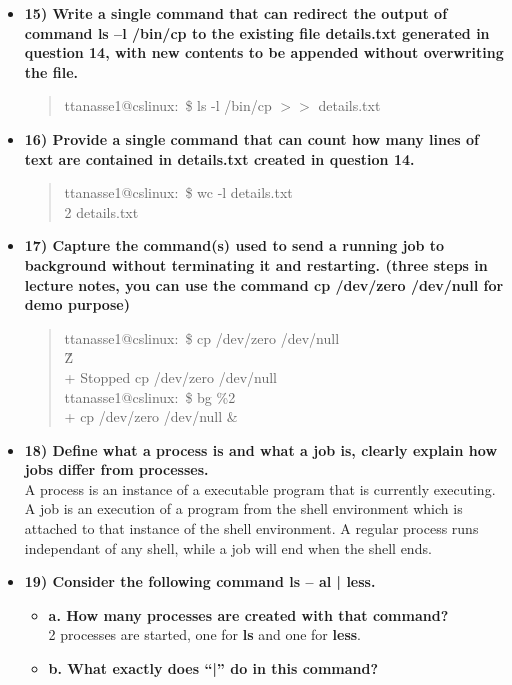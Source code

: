 \documentclass{article}
\begin{document}
\begin{itemize}
\begin{quote}
  \end{quote}
  \item \textbf{15) Write a single command that can redirect the output of command ls –l /bin/cp to the existing file details.txt generated in question 14, with new contents to be appended without overwriting the file.}
  \begin{quote}
    ttanasse1@cslinux:~\$ ls -l /bin/cp $>>$ details.txt
  \end{quote}
  \item \textbf{16) Provide a single command that can count how many lines of text are contained in details.txt created in question 14.}
  \begin{quote}
    ttanasse1@cslinux:~\$ wc -l details.txt\\
    2 details.txt
  \end{quote}
  \item \textbf{17) Capture the command(s) used to send a running job to background without terminating it and restarting. (three steps in lecture notes, you can use the command cp /dev/zero /dev/null for demo purpose)}
  \begin{quote}
    ttanasse1@cslinux:~\$ cp /dev/zero /dev/null\\
    \^Z\\ \relax
    [2]+  Stopped cp /dev/zero /dev/null\\
    ttanasse1@cslinux:~\$ bg \%2\\ \relax
    [2]+ cp /dev/zero /dev/null \&
  \end{quote}
  \item \textbf{18) Define what a process is and what a job is, clearly explain how jobs differ from processes.}\\
  A process is an instance of a executable program that is currently executing. A job is an execution of a program from the shell environment which is attached to that instance of the shell environment. A regular process runs independant of any shell, while a job will end when the shell ends.
  \pagebreak
  \item \textbf{19) Consider the following command ls – al | less.}
  \begin{itemize}
    \item \textbf{a. How many processes are created with that command?}\\
    2 processes are started, one for \textbf{ls} and one for \textbf{less}.
    \item \textbf{b. What exactly does “|” do in this command?}\\

\end{itemize}
\end{itemize}
\end{document}

